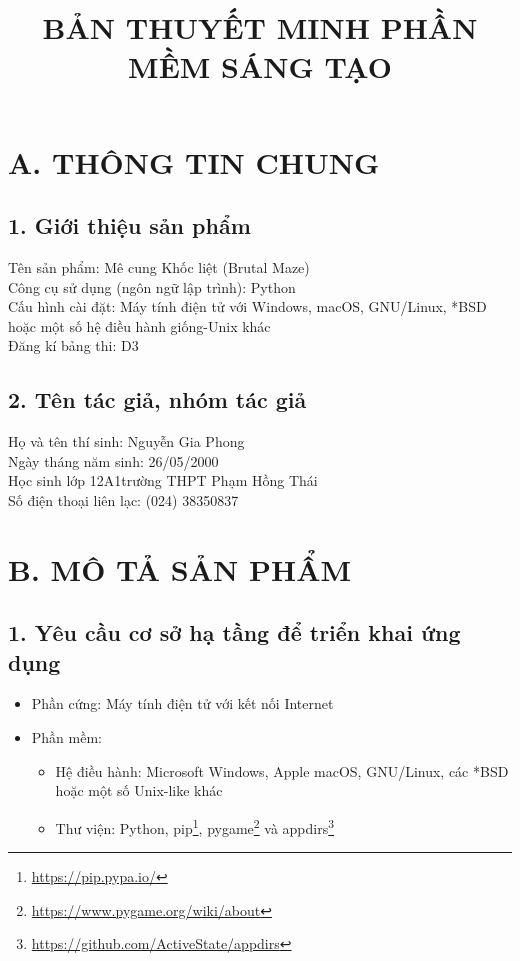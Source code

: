 \documentclass[a4paper,11pt]{article}
\title{BẢN THUYẾT MINH PHẦN MỀM SÁNG TẠO}
\author{}
\date{}
\begin{document}
\maketitle
\section*{A. THÔNG TIN CHUNG}
\subsection*{1. Giới thiệu sản phẩm}
Tên sản phẩm: Mê cung Khốc liệt (Brutal Maze)\\
Công cụ sử dụng (ngôn ngữ lập trình): Python\\
Cấu hình cài đặt: Máy tính điện tử với Windows, macOS, GNU/Linux, *BSD hoặc một
số hệ điều hành giống-Unix khác\\
Đăng kí bảng thi: D3

\subsection*{2. Tên tác giả, nhóm tác giả}
Họ và tên thí sinh: Nguyễn Gia Phong\\
Ngày tháng năm sinh: 26/05/2000\\
Học sinh lớp 12A1\hfill trường THPT Phạm Hồng Thái\\
Số điện thoại liên lạc: (024) 38350837

\section*{B. MÔ TẢ SẢN PHẨM}
\subsection*{1. Yêu cầu cơ sở hạ tầng để triển khai ứng dụng}
\begin{itemize}
  \item Phần cứng: Máy tính điện tử với kết nối Internet
  \item Phần mềm:
    \begin{itemize}
      \item Hệ điều hành: Microsoft Windows, Apple macOS, GNU/Linux, các *BSD
        hoặc một số Unix-like khác
      \item Thư viện: Python, pip\footnote{\url{https://pip.pypa.io/}},
        pygame\footnote{\url{https://www.pygame.org/wiki/about}} và
        appdirs\footnote{\url{https://github.com/ActiveState/appdirs}}
    \end{itemize}
\end{itemize}
\end{document}
